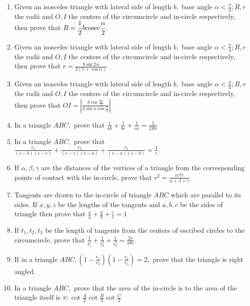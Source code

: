 \begin{enumerate}
\item Given an isosceles triangle with lateral side of length $b,$ base angle $\alpha < \frac{\pi}{4};R, r$ the radii and
   $O, I$ the centers of the circumcircle and in-circle respectively, then prove that $R =
   \frac{1}{2}b{\rm cosec}\frac{\alpha}{2}.$

\item Given an isosceles triangle with lateral side of length $b,$ base angle $\alpha < \frac{\pi}{4};R, r$ the radii and
   $O, I$ the centers of the circumcircle and in-circle respectively, then prove that $r = \frac{b\sin2\alpha}{2(1 +
   \cos\alpha)}$

\item Given an isosceles triangle with lateral side of length $b,$ base angle $\alpha < \frac{\pi}{4};R, r$ the radii and
   $O, I$ the centers of the circumcircle and in-circle respectively, then prove that $OI =
   \left|\frac{b\cos\frac{3\alpha}{2}}{2\sin \alpha\cos\frac{\alpha}{2}}\right|$

\item In a triangle $ABC,$ prove that $\frac{1}{ab} + \frac{1}{bc} + \frac{1}{ca} = \frac{1}{2Rr}$

\item In a triangle $ABC,$ prove that $\frac{r_1}{(s - b)(s - c)} + \frac{r_2}{(s - c)(s - a)} + \frac{r_3}{(s - a)(s -
   b)} = \frac{3}{r}.$

\item If $\alpha, \beta, \gamma$ are the distances of the vertices of a triangle from the corresponding points of contact with
   the in-circle, prove that $r^2 = \frac{\alpha\beta\gamma}{\alpha + \beta + \gamma}$

\item Tangents are drawn to the in-circle of triangle $ABC$ which are parallel to its sides. If $x, y, z$ be the lengths
   of the tangents and $a, b, c$ be the sides of triangle then prove that $\frac{x}{a} + \frac{y}{b} + \frac{z}{c} = 1$

\item If $t_1, t_2, t_3$ be the length of tangents from the centers of escribed circles to the circumcircle, prove that
   $\frac{1}{t_1^2} + \frac{1}{t_2^2} + \frac{1}{t_3^2} = \frac{2s}{abc}.$

\item If in a triangle $ABC, \left(1 - \frac{r_1}{r_2}\right)\left(1 - \frac{r_1}{r_3}\right) = 2,$ prove that the
   triangle is right angled.

\item In a triangle $ABC,$ prove that the area of the in-circle is to the area of the triangle itself is $\pi:
   \cot\frac{A}{2}\cot\frac{B}{2}\cot\frac{C}{2}$


\end{enumerate}
